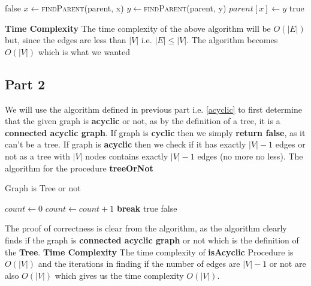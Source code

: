 \documentclass{article}
\let\bold\textbf
\begin{document}
{{\begin{algorithm}
\begin{algorithmic}[1]
              \State \Return false
            \EndIf
            \State $x\gets$\textsc{findParent}(parent, x)
            \State $y\gets$\textsc{findParent}(parent, y)
            \State $parent[x] \gets y$
          \EndFor
          \State \Return true
        \EndProcedure
      \end{algorithmic}
    \end{algorithm}
    \newline \bold{Time Complexity} \newline
    The time complexity of the above algorithm will be $O(|E|)$ but, since the edges are less than $|V|$ i.e. $|E| \leq |V|$. \newline
    The algorithm becomes $O(|V|)$ which is what we wanted
  }
  \subsection{Part 2}{
    We will use the algorithm defined in previous part i.e. \ref{acyclic} to first determine that the given graph is \bold{acyclic} or not, as by the definition of a tree, it is a \bold{connected acyclic graph}. \newline
    If graph is \bold{cyclic} then we simply \bold{return false}, as it can't be a tree. \newline
    If graph is \bold{acyclic} then we check if it has exactly $|V|-1$ edges or not as a tree with $|V|$ nodes contains exactly $|V|-1$ edges (no more no less). \newline
    The algorithm for the procedure \bold{treeOrNot}
    \begin{algorithm}
      \caption{Graph is Tree or not}
      \begin{algorithmic}[1]
        \Comment{returns a \bold{Boolean}}
            \State $count\gets 0$
              \State $count\gets count+1$
                \State \bold{break}
              \EndIf
            \EndFor
              \State \Return true
            \EndIf
          \EndIf
          \State \Return false
        \EndProcedure
      \end{algorithmic}
    \end{algorithm}
    \newline The proof of correctness is clear from the algorithm, as the algorithm clearly finds if the graph is \bold{connected acyclic graph} or not which is the definition of the \bold{Tree}.
    \newline \newline \bold{Time Complexity}
    \newline The time complexity of \bold{isAcyclic} Procedure is $O(|V|)$ and the iterations in finding if the number of edges are $|V|-1$ or not are also $O(|V|)$ which gives us the time complexity $O(|V|)$.
  }
}
\newpage
\end{document}
